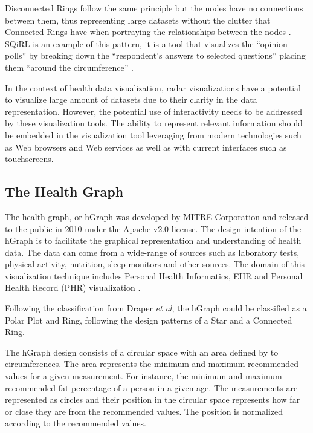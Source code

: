 \documentclass[twocolumn]{bmcart}%
\begin{document}
Disconnected Rings follow the same principle but the nodes have no connections between them, thus representing large datasets without the clutter that Connected Rings have when portraying the relationships between the nodes \cite{draper2009survey}. SQiRL is an example of this pattern, it is a tool that visualizes the ``opinion polls'' by breaking down the ``respondent's answers to selected questions'' placing them ``around the circumference'' \cite{draper2008votes, draper2009survey}.



In the context of health data visualization, radar visualizations have a potential to  visualize large amount of datasets due to their clarity in the data representation. However, the potential use of interactivity needs to be addressed by these visualization tools. The ability to represent relevant information should be embedded in the visualization tool leveraging from modern technologies such as Web browsers and Web services as well as with current interfaces such as touchscreens.

\subsection*{The Health Graph}

The health graph, or hGraph was developed by MITRE Corporation and released to the public in 2010 under the Apache v2.0 license. The design intention of the hGraph is to facilitate the graphical representation and understanding of health data. The data can come from a wide-range of sources such as laboratory tests, physical activity, nutrition, sleep monitors and other sources. The domain of this visualization technique includes Personal Health Informatics, EHR and Personal Health Record (PHR) visualization \cite{follett2012hgraph}.

Following the classification from Draper \textit{et al}, the hGraph could be classified as a Polar Plot and Ring, following the design patterns of a Star and a Connected Ring.

The hGraph design consists of a circular space with an area defined by to circumferences. The area represents the minimum and maximum recommended values for a given measurement. For instance, the minimum and maximum recommended fat percentage of a person in a given age. The measurements are represented as circles and their position in the circular space represents how far or close they are from the recommended values. The position is normalized according to the recommended values.
\end{document}
